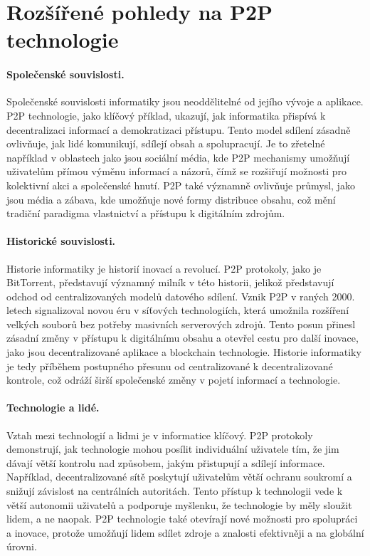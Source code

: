 \documentclass[10pt,twoside,czech,a4paper]{article}
\begin{document}
\section{Rozšířené pohledy na P2P technologie}

\paragraph{Společenské souvislosti.}

Společenské souvislosti informatiky jsou neoddělitelné od jejího vývoje a aplikace.
P2P technologie, jako klíčový příklad, ukazují, jak informatika přispívá k decentralizaci informací a demokratizaci přístupu.
Tento model sdílení zásadně ovlivňuje, jak lidé komunikují, sdílejí obsah a spolupracují.
Je to zřetelné například v oblastech jako jsou sociální média, kde P2P mechanismy umožňují uživatelům přímou výměnu informací a názorů, čímž se rozšiřují možnosti pro kolektivní akci a společenské hnutí.
P2P také významně ovlivňuje průmysl, jako jsou média a zábava, kde umožňuje nové formy distribuce obsahu, což mění tradiční paradigma vlastnictví a přístupu k digitálním zdrojům.

\paragraph{Historické souvislosti.}

Historie informatiky je historií inovací a revolucí. P2P protokoly, jako je BitTorrent, představují významný milník v této historii, jelikož představují odchod od centralizovaných modelů datového sdílení.
Vznik P2P v raných 2000. letech signalizoval novou éru v síťových technologiích, která umožnila rozšíření velkých souborů bez potřeby masivních serverových zdrojů.
Tento posun přinesl zásadní změny v přístupu k digitálnímu obsahu a otevřel cestu pro další inovace, jako jsou decentralizované aplikace a blockchain technologie.
Historie informatiky je tedy příběhem postupného přesunu od centralizované k decentralizované kontrole, což odráží širší společenské změny v pojetí informací a technologie.

\paragraph{Technologie a lidé.}

Vztah mezi technologií a lidmi je v informatice klíčový.
P2P protokoly demonstrují, jak technologie mohou posílit individuální uživatele tím, že jim dávají větší kontrolu nad způsobem, jakým přistupují a sdílejí informace.
Například, decentralizované sítě poskytují uživatelům větší ochranu soukromí a snižují závislost na centrálních autoritách.
Tento přístup k technologii vede k větší autonomii uživatelů a podporuje myšlenku, že technologie by měly sloužit lidem, a ne naopak.
P2P technologie také otevírají nové možnosti pro spolupráci a inovace, protože umožňují lidem sdílet zdroje a znalosti efektivněji a na globální úrovni.
\end{document}
